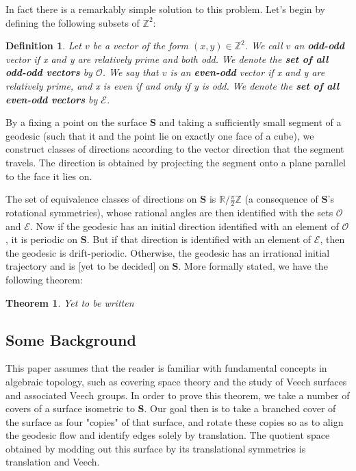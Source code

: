 \documentclass[]{article}
\newtheorem*{thm*}{Theorem}
\newtheorem*{def*}{Definition}
\begin{document}
In fact there is a remarkably simple solution to this problem. Let's begin by defining the following subsets of $\mathbb{Z}^2$:

\begin{def*}
Let $v$ be a vector of the form $(x,y)\in\mathbb{Z}^{2}$. We call $v$ an \textbf{odd-odd} vector if x and y are relatively prime and both odd. We denote the \textbf{set of all odd-odd vectors} by $\mathcal{O}$. We say that $v$ is an  \textbf{even-odd} vector if x and y are relatively prime, and x is even if and only if y is odd. We denote the \textbf{set of all even-odd vectors} by $\mathcal{E}$.
\end{def*}

By a fixing a point on the surface $\mathbf S$ and taking a sufficiently small segment of a geodesic (such that it and the point lie on exactly one face of a cube), we construct classes of directions according to the vector direction that the segment travels. The direction is obtained by projecting the segment onto a plane parallel to the face it lies on.

\begin{figure}[H]
\centering

\end{figure}

The set of equivalence classes of directions on $\mathbf S$ is $\mathbb R/\frac{\pi}{2}\mathbb Z$ (a consequence of $\mathbf S$'s rotational symmetries), whose rational angles are then identified with the sets $\mathcal{O}$ and $\mathcal{E}$. Now if the geodesic has an initial direction identified with an element of $\mathcal{O}$, it is periodic on $\mathbf S$. But if that direction is identified with an element of $\mathcal{E}$, then the geodesic is drift-periodic. Otherwise, the geodesic has an irrational initial trajectory and is [yet to be decided] on $\mathbf S$. More formally stated, we have the following theorem:

\begin{thm*}
Yet to be written
\end{thm*}

\subsection{Some Background}
This paper assumes that the reader is familiar with fundamental concepts in algebraic topology, such as covering space theory and the study of Veech surfaces and associated Veech groups. In order to prove this theorem, we take a number of covers of a surface isometric to $\mathbf S$. Our goal then is to take a branched cover of the surface as four "copies" of that surface, and rotate these copies so as to align the geodesic flow and identify edges solely by translation. The quotient space obtained by modding out this surface by its translational symmetries is translation and Veech.
\end{document}

